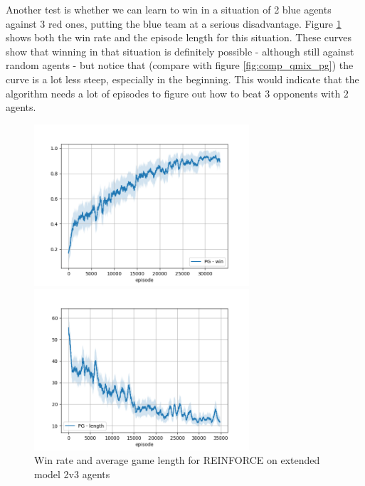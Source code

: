 Another test is whether we can learn to win in a situation of 2 blue agents against 3 red ones, putting the blue team at a serious disadvantage. Figure \ref{fig:pg_extended2} shows both the win rate and the episode length for this situation. These curves show that winning in that situation is definitely possible - although still against random agents - but notice that (compare with figure \ref{fig:comp_qmix_pg}) the curve is a lot less steep, especially in the beginning. This would indicate that the algorithm needs a lot of episodes to figure out how to beat $3$ opponents with $2$ agents.

\begin{figure}[htp]
\centering
\begin{minipage}{.45\textwidth}
  \centering
  \includegraphics[width=8cm]{images/experiment6/pg_win_2v3.png}
\end{minipage}%
\begin{minipage}{.05\textwidth}
\centering
  \caption*{ }
\end{minipage}%
\begin{minipage}{.45\textwidth}
  \centering
  \includegraphics[width=8cm]{images/experiment6/pg_length_2v3.png}
\end{minipage}
\caption{Win rate and average game length for REINFORCE on extended model 2v3 agents}
\label{fig:pg_extended2}
\end{figure}

